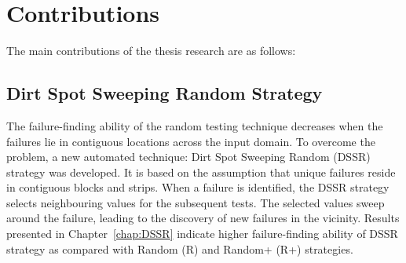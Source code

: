 


\section{Contributions}\label{contributions_1}
The main contributions of the thesis research are as follows: 

\subsection{Dirt Spot Sweeping Random Strategy}

The failure-finding ability of the random testing technique decreases when the failures lie in contiguous locations across the input domain. To overcome the problem, a new automated technique: Dirt Spot Sweeping Random (DSSR) strategy was developed. It is based on the assumption that unique failures reside in contiguous blocks and strips. When a failure is identified, the DSSR strategy selects neighbouring values for the subsequent tests. The selected values sweep around the failure, leading to the discovery of new failures in the vicinity. Results presented in Chapter~\ref{chap:DSSR} indicate higher failure-finding ability of DSSR strategy as compared with Random (R) and Random+ (R+) strategies.

